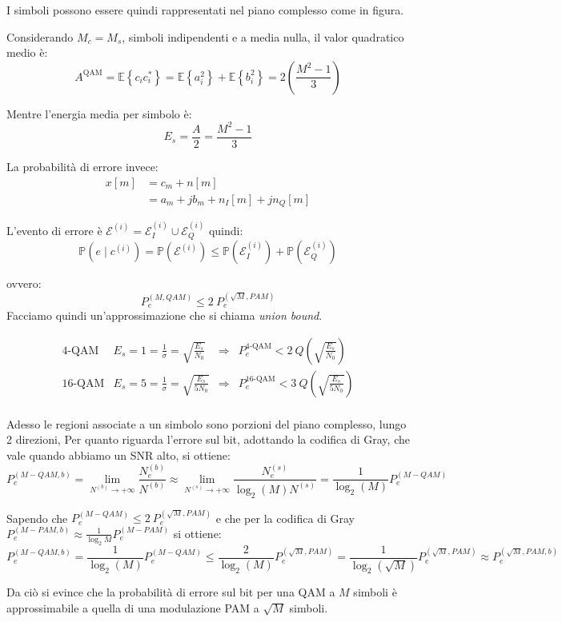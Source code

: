 I simboli possono essere quindi rappresentati nel piano complesso come in figura.

Considerando $M_c = M_s$, simboli indipendenti e a media nulla, il valor quadratico medio è:
\[
    A^{\text{QAM}} = \mathbb{E} \left\{  c_i c^*_i  \right\} = \mathbb{E} \left\{ a_i^2 \right\} + \mathbb{E} \left\{ b_i^2 \right\} = 2 \left( \frac{M^2 - 1}{3} \right)
\]

Mentre l'energia media per simbolo è:
\[
    E_s = \frac{A}{2} = \frac{M^2 - 1}{3}
\]

La probabilità di errore invece:
\begin{align*}
    x\left[ m \right] &= c_m + n \left[ m \right] \\
    &= a_m + j b_m + n_I \left[ m \right] + j n_Q \left[ m \right]
\end{align*}


L'evento di errore è $\mathcal{E}^{(i)} = \mathcal{E}_I^{(i)} \cup \mathcal{E}_Q^{(i)}$ quindi:
\[
    \mathbb{P} \left( e \mid c^{(i)} \right) = \mathbb{P} \left( \mathcal{E}^{(i)} \right) \leq \mathbb{P} \left( \mathcal{E}_I^{(i)} \right) + \mathbb{P} \left( \mathcal{E}_Q^{(i)} \right)
\]

ovvero:
\[
    P_e^{(M, QAM)} \leq 2 \ P_e^{(\sqrt{M}, PAM)}
\]
Facciamo quindi un'approssimazione che si chiama \textit{union bound}.




\[
\begin{array}{ccccc}
\text{4-QAM} & E_s = 1 = \frac{1}{\sigma} = \sqrt{\frac{E_s}{N_0}} & \Rightarrow & P_e^{\text{4-QAM}} < 2 \ Q\left(\sqrt{\frac{E_s}{N_0}}\right) \\
\text{16-QAM} & E_s = 5 = \frac{1}{\sigma} = \sqrt{\frac{E_s}{5N_0}} & \Rightarrow & P_e^{\text{16-QAM}} < 3 \ Q\left(\sqrt{\frac{E_s}{5N_0}}\right)\\
\end{array}
\]

Adesso le regioni associate a un simbolo sono porzioni del piano complesso, lungo 2 direzioni,
Per quanto riguarda l'errore sul bit, adottando la codifica di Gray, che vale quando abbiamo un SNR alto, si ottiene:
\[
    P_e^{(M-QAM, b)} = \lim_{N^{(b)} \to +\infty} \frac{N_e^{(b)}}{N^{(b)}} \approx \lim_{N^{(s)} \to +\infty} \frac{N_e^{(s)}}{\log_2(M) N^{(s)}} = \frac{1}{\log_2(M)} P_e^{(M-QAM)} 
\]

Sapendo che $P_e^{(M-QAM)} \leq 2 \ P_e^{(\sqrt{M}, PAM)}$ e che per la codifica di Gray $P_e^{(M-PAM, b)} \approx \frac{1}{\log_2{M}} P_e^{(M-PAM)}$ si ottiene:
\[
     P_e^{(M-QAM, b)} = \frac{1}{\log_2(M)} P_e^{(M-QAM)} \leq \frac{2}{\log_2(M)} P_e^{(\sqrt{M}, PAM)} = \frac{1}{\log_2(\sqrt{M})} P_e^{(\sqrt{M}, PAM)} \approx P_e^{(\sqrt{M}, PAM, b)}
\]

Da ciò si evince che la probabilità di errore sul bit per una QAM a $M$ simboli è approssimabile a quella di una modulazione PAM a $\sqrt{M}$ simboli.

